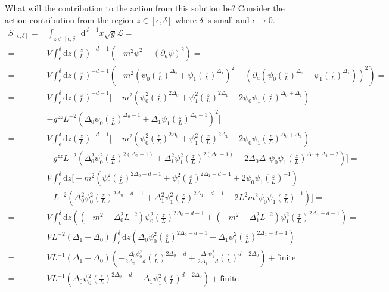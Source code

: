 \documentclass[12pt]{report}
\renewcommand{\d}{\ensuremath{\mathrm{d}}}
\renewcommand{\L}{\ensuremath{\mathcal{L}}}
\begin{document}
What will the contribution to the action from this solution be? Consider the action contribution from the region $z\in[\epsilon,\delta]$ where $\delta$ is small and $\epsilon\rightarrow0$.
\begin{equation}
\begin{split}
 S_{[\epsilon,\delta]}=&\int_{z\in[\epsilon,\delta]}\d^{d+1} x\sqrt{g}\L=\\
=&V\int_\epsilon^\delta\d z \left(\frac{z}{L}\right)^{-d-1}\left(-m^2\psi^2-(\partial_a\psi)^2\right)=\\
=&V\int_\epsilon^\delta\d z \left(\frac{z}{L}\right)^{-d-1}\left(-m^2( \psi_0\left(\frac{z}{L}\right)^{\Delta_0}+\psi_1\left(\frac{z}{L}\right)^{\Delta_1} )^2-(\partial_a(\psi_0\left(\frac{z}{L}\right)^{\Delta_0}+\psi_1\left(\frac{z}{L}\right)^{\Delta_1}))^2\right)=\\
=&V\int_\epsilon^\delta\d z \left(\frac{z}{L}\right)^{-d-1}\Big[-m^2 \left(\psi_0^2\left(\frac{z}{L}\right)^{2\Delta_0}+\psi_1^2\left(\frac{z}{L}\right)^{2\Delta_1}+2\psi_0\psi_1\left(\frac{z}{L}\right)^{\Delta_0+\Delta_1}\right) \\
&-g^{zz}L^{-2}(\Delta_0\psi_0\left(\frac{z}{L}\right)^{\Delta_0-1}+\Delta_1\psi_1\left(\frac{z}{L}\right)^{\Delta_1-1})^2\Big]=\\
=&V\int_\epsilon^\delta\d z\left(\frac{z}{L}\right)^{-d-1}\Big[-m^2 \left(\psi_0^2\left(\frac{z}{L}\right)^{2\Delta_0}+\psi_1^2\left(\frac{z}{L}\right)^{2\Delta_1}+2\psi_0\psi_1\left(\frac{z}{L}\right)^{\Delta_0+\Delta_1}\right)\\
&-g^{zz}L^{-2}\left(\Delta_0^2\psi_0^2\left(\frac{z}{L}\right)^{2(\Delta_0-1)}+\Delta_1^2\psi_1^2\left(\frac{z}{L}\right)^{2(\Delta_1-1)}+
2\Delta_0\Delta_1\psi_0\psi_1\left(\frac{z}{L}\right)^{\Delta_0+\Delta_1-2}\right)\Big]=\\
=&V\int_\epsilon^\delta\d z\Big[-m^2 \left(\psi_0^2\left(\frac{z}{L}\right)^{2\Delta_0-d-1}+\psi_1^2\left(\frac{z}{L}\right)^{2\Delta_1-d-1}+2\psi_0\psi_1\left(\frac{z}{L}\right)^{-1}\right)\\
&-L^{-2}\left(\Delta_0^2\psi_0^2\left(\frac{z}{L}\right)^{2\Delta_0-d-1}+\Delta_1^2\psi_1^2\left(\frac{z}{L}\right)^{2\Delta_1-d-1}-
2L^2m^2\psi_0\psi_1\left(\frac{z}{L}\right)^{-1}\right)\Big]=\\
=&V\int_\epsilon^\delta\d z \left((-m^2-\Delta_0^2L^{-2})\psi_0^2\left(\frac{z}{L}\right)^{2\Delta_0-d-1}+(-m^2-\Delta_1^2L^{-2})\psi_1^2\left(\frac{z}{L}\right)^{2\Delta_1-d-1}\right)=\\
=&VL^{-2}(\Delta_1-\Delta_0)\int_\epsilon^\delta\d z \left(\Delta_0\psi_0^2\left(\frac{z}{L}\right)^{2\Delta_0-d-1}-\Delta_1\psi_1^2\left(\frac{z}{L}\right)^{2\Delta_1-d-1}\right)=\\
=&VL^{-1}(\Delta_1-\Delta_0)\left(-\frac{ \Delta_0\psi_0^2}{2\Delta_0-d}\left(\frac{\epsilon}{L}\right)^{2\Delta_0-d}+
\frac{\Delta_1 \psi_1^2}{2\Delta_1-d}\left(\frac{\epsilon}{L}\right)^{d-2\Delta_0}\right)+\mathrm{finite}\\
=&VL^{-1}\left(\Delta_0\psi_0^2\left(\frac{\epsilon}{L}\right)^{2\Delta_0-d}-
\Delta_1\psi_1^2\left(\frac{\epsilon}{L}\right)^{d-2\Delta_0}\right)+\mathrm{finite}
\end{split}
\end{equation}
\end{document}
